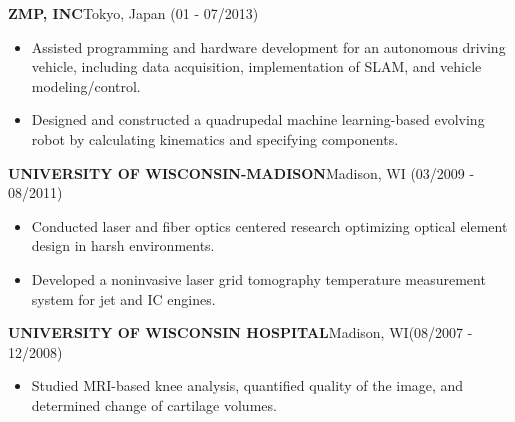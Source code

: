 \documentclass[12pt,letterpaper]{article}
\begin{document}
\MakeUppercase{\bf ZMP, Inc}\hfill{Tokyo, Japan }{(01 - 07/2013)}\\
\hspace{5mm}{\bf Research Engineer in Autonomous Vehicles}
\begin{itemize}
\item Assisted programming and hardware development for an autonomous driving vehicle, including data acquisition, implementation of SLAM, and vehicle modeling/control.
\item Designed and constructed a quadrupedal machine learning-based evolving robot by calculating kinematics and specifying components.
\end{itemize}

\MakeUppercase{\bf University of Wisconsin-Madison}\hfill{Madison, WI}{ (03/2009 - 08/2011)}\\
\hspace{5mm}{\bf Graduate Research Assistant for Engine Research Center}
\begin{itemize}
\item Conducted laser and fiber optics centered research optimizing optical element design in harsh environments. 
\item Developed a noninvasive laser grid tomography temperature measurement system for jet and IC engines.
\end{itemize}

\MakeUppercase{\bf University of Wisconsin Hospital}\hfill{Madison, WI}{ {(08/2007 - 12/2008)}}\\
\hspace{5mm}{\bf MRI Research Assistant for Radiology Department}
\begin{itemize}
\item Studied MRI-based knee analysis, quantified quality of the image, and determined change of cartilage volumes.
\end{itemize}

\vspace{-5mm}
\end{document}

